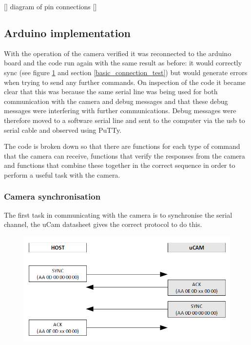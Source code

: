 [] diagram of pin connections []

\subsection{Arduino implementation}
\label{sec:arduino_imp}

With the operation of the camera verified it was reconnected to the arduino board and the code run again with the same result as before: it would correctly sync (see figure \ref{fig:syncProto} and section \ref{basic_connection_test}) but would generate errors when trying to send any further commands. On inspection of the code it became clear that this was because the same serial line was being used for both communication with the camera and debug messages and that these debug messages were interfering with further communications. Debug messages were therefore moved to a software serial line and sent to the computer via the usb to serial cable and observed using PuTTy.

The code is broken down so that there are functions for each type of command that the camera can receive, functions that verify the responses from the camera and functions that combine these together in the correct sequence in order to perform a useful task with the camera.

\subsubsection{Camera synchronisation}

The first task in communicating with the camera is to synchronise the serial channel, the uCam datasheet \cite{ucam_datasheet} gives the correct protocol to do this.

\begin{figure}[H]
        \centering
        \includegraphics[width=1.00\textwidth]{figures/SyncProtocal.png}
        \label{fig:syncProto}
\end{figure}

